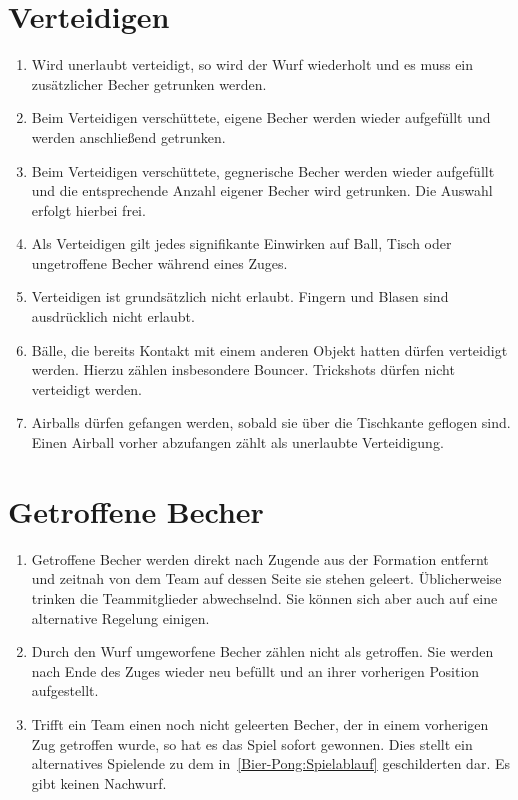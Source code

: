 \section{Verteidigen}\label{Bier-Pong:Verteidigen}
\begin{enumerate}[label={(\arabic*)}]
    \item
    Wird unerlaubt verteidigt, so wird der Wurf wiederholt und es muss ein zusätzlicher Becher getrunken werden.

    \item
    Beim Verteidigen verschüttete, eigene Becher werden wieder aufgefüllt und werden anschließend getrunken.

    \item
    Beim Verteidigen verschüttete, gegnerische Becher werden wieder aufgefüllt und die entsprechende Anzahl eigener Becher wird getrunken.
    Die Auswahl erfolgt hierbei frei.

    \item
    Als Verteidigen gilt jedes signifikante Einwirken auf Ball, Tisch oder ungetroffene Becher während eines Zuges.

    \item
    Verteidigen ist grundsätzlich nicht erlaubt.
    Fingern und Blasen sind ausdrücklich nicht erlaubt.

    \item
    Bälle, die bereits Kontakt mit einem anderen Objekt hatten dürfen verteidigt werden.
    Hierzu zählen insbesondere Bouncer.
    Trickshots dürfen nicht verteidigt werden.

    \item
    Airballs dürfen gefangen werden, sobald sie über die Tischkante geflogen sind.
    Einen Airball vorher abzufangen zählt als unerlaubte Verteidigung.
\end{enumerate}

\section{Getroffene Becher}
\begin{enumerate}[label={(\arabic*)}]
    \item
    Getroffene Becher werden direkt nach Zugende aus der Formation entfernt und zeitnah von dem Team auf dessen Seite sie stehen geleert.
    Üblicherweise trinken die Teammitglieder abwechselnd.
    Sie können sich aber auch auf eine alternative Regelung einigen.

    \item
    Durch den Wurf umgeworfene Becher zählen nicht als getroffen.
    Sie werden nach Ende des Zuges wieder neu befüllt und an ihrer vorherigen Position aufgestellt.

    \item
    Trifft ein Team einen noch nicht geleerten Becher, der in einem vorherigen Zug getroffen wurde, so hat es das Spiel sofort gewonnen.
    Dies stellt ein alternatives Spielende zu dem in~\ref{Bier-Pong:Spielablauf} geschilderten dar.
    Es gibt keinen Nachwurf.
\end{enumerate}


